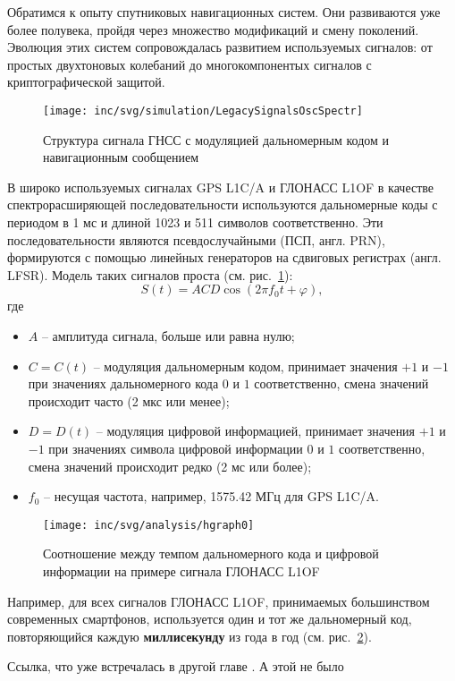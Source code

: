 Обратимся к опыту спутниковых навигационных систем. 
Они развиваются уже более полувека, пройдя через множество модификаций и смену поколений. 
Эволюция этих систем сопровождалась развитием используемых сигналов: от простых двухтоновых колебаний до многокомпонентых сигналов с криптографической защитой. 

\begin{figure}[ht]
  \centering
  \texttt{[image: inc/svg/simulation/LegacySignalsOscSpectr]}
  \caption{Структура сигнала ГНСС с модуляцией дальномерным кодом и навигационным сообщением}
  \label{fig:LegacySignalsOscSpectr}
\end{figure}

В широко используемых сигналах GPS L1C/A и ГЛОНАСС L1OF в качестве спектрорасширяющей последовательности используются дальномерные коды с периодом в 1 мс и длиной 1023 и 511 символов соответственно. 
Эти последовательности являются псевдослучайными (ПСП, англ. PRN), формируются с помощью линейных генераторов на сдвиговых регистрах (англ. LFSR). 
Модель таких сигналов проста (см. рис.~\ref{fig:LegacySignalsOscSpectr}):
\begin{equation}
S\left( t  \right) = A C D \cos \left( 2 \pi f_0  t  + \varphi \right),
\end{equation}
где
\begin{itemize}
\item $A$ -- амплитуда сигнала, больше или равна нулю;
\item $C = C\left( t  \right)$ -- модуляция дальномерным кодом, принимает значения $+1$ и $-1$ при значениях дальномерного кода $0$ и $1$ соответственно, смена значений происходит часто (2 мкс или менее);
\item $D = D\left( t \right)$ -- модуляция цифровой информацией, принимает значения $+1$ и $-1$ при значениях символа цифровой информации $0$ и $1$ соответственно, смена значений происходит редко (2 мс или более);
\item $f_0$ -- несущая частота, например, 1575.42 МГц для GPS L1C/A.
\end{itemize}

\begin{figure}[ht]
  \centering
  \texttt{[image: inc/svg/analysis/hgraph0]}
  \caption{Соотношение между темпом дальномерного кода и цифровой информации на примере сигнала ГЛОНАСС L1OF}
  \label{fig:hgraph0}
\end{figure}

Например, для всех сигналов ГЛОНАСС L1OF, принимаемых большинством современных смартфонов, используется один и тот же дальномерный код, повторяющийся каждую \textbf{миллисекунду} из года в год (см. рис.~\ref{fig:hgraph0}).

Ссылка, что уже встречалась в другой главе \autocite{basile2018}. 
А этой не было \cite{babyrov2013}

{
\renewcommand*{\bibfont}{\small}
\printbibliography[heading=subbibforcha, segment=\therefsegment]
}
